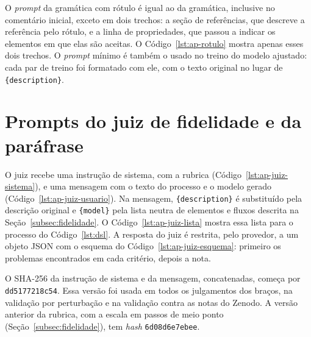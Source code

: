 \begin{apendicesenv}
O \textit{prompt} da gramática com rótulo é igual ao da gramática, inclusive no comentário inicial, exceto em dois trechos: a seção de referências, que descreve a referência pelo rótulo, e a linha de propriedades, que passou a indicar os elementos em que elas são aceitas. O Código~\ref{lst:ap-rotulo} mostra apenas esses dois trechos. O \textit{prompt} mínimo é também o usado no treino do modelo ajustado: cada par de treino foi formatado com ele, com o texto original no lugar de \texttt{\{description\}}.









\chapter{Prompts do juiz de fidelidade e da paráfrase}\label{ap:prompts-juiz}

O juiz recebe uma instrução de sistema, com a rubrica (Código~\ref{lst:ap-juiz-sistema}), e uma mensagem com o texto do processo e o modelo gerado (Código~\ref{lst:ap-juiz-usuario}). Na mensagem, \texttt{\{description\}} é substituído pela descrição original e \texttt{\{model\}} pela lista neutra de elementos e fluxos descrita na Seção~\ref{subsec:fidelidade}. O Código~\ref{lst:ap-juiz-lista} mostra essa lista para o processo do Código~\ref{lst:dsl}. A resposta do juiz é restrita, pelo provedor, a um objeto JSON com o esquema do Código~\ref{lst:ap-juiz-esquema}: primeiro os problemas encontrados em cada critério, depois a nota.

O SHA-256 da instrução de sistema e da mensagem, concatenadas, começa por \texttt{dd5177218c54}. Essa versão foi usada em todos os julgamentos dos braços, na validação por perturbação e na validação contra as notas do Zenodo. A versão anterior da rubrica, com a escala em passos de meio ponto (Seção~\ref{subsec:fidelidade}), tem \textit{hash} \texttt{6d08d6e7ebee}.


\end{apendicesenv}
